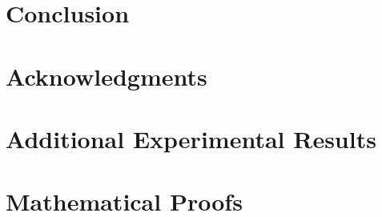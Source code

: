 \documentclass[11pt,a4paper]{article}
\begin{document}

\section{Conclusion}
\label{sec:conclusion}



\section*{Acknowledgments}




\appendix
\section{Additional Experimental Results}
\label{app:additional_results}


\section{Mathematical Proofs}
\label{app:proofs}

\end{document}

